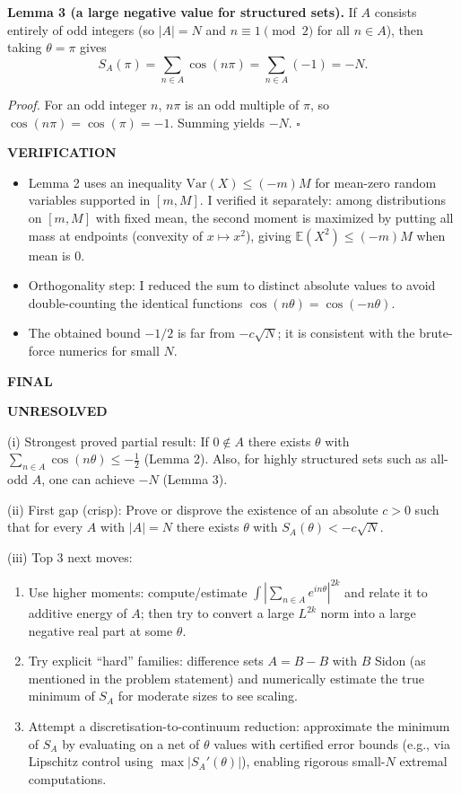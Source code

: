 \medskip
\noindent\textbf{Lemma 3 (a large negative value for structured sets).}
If $A$ consists entirely of odd integers (so $|A|=N$ and $n\equiv 1\pmod 2$ for all $n\in A$), then taking $\theta=\pi$ gives
\[
S_A(\pi)=\sum_{n\in A}\cos(n\pi)=\sum_{n\in A}(-1)=-N.
\]

\textit{Proof.}
For an odd integer $n$, $n\pi$ is an odd multiple of $\pi$, so $\cos(n\pi)=\cos(\pi)= -1$. Summing yields $-N$.
\hfill$\square$

\medskip
\noindent\textbf{VERIFICATION}

\begin{itemize}
\item Lemma 2 uses an inequality $\mathrm{Var}(X)\le (-m)M$ for mean-zero random variables supported in $[m,M]$. I verified it separately: among distributions on $[m,M]$ with fixed mean, the second moment is maximized by putting all mass at endpoints (convexity of $x\mapsto x^2$), giving $\mathbb{E}(X^2)\le (-m)M$ when mean is $0$.
\item Orthogonality step: I reduced the sum to distinct absolute values to avoid double-counting the identical functions $\cos(n\theta)=\cos(-n\theta)$.
\item The obtained bound $-1/2$ is far from $-c\sqrt{N}$; it is consistent with the brute-force numerics for small $N$.
\end{itemize}

\medskip
\noindent\textbf{FINAL}

\textbf{UNRESOLVED}

(i) Strongest proved partial result: If $0\notin A$ there exists $\theta$ with $\sum_{n\in A}\cos(n\theta)\le -\tfrac12$ (Lemma 2). Also, for highly structured sets such as all-odd $A$, one can achieve $-N$ (Lemma 3).

(ii) First gap (crisp): Prove or disprove the existence of an absolute $c>0$ such that for every $A$ with $|A|=N$ there exists $\theta$ with $S_A(\theta)<-c\sqrt{N}$.

(iii) Top 3 next moves:
\begin{enumerate}
\item Use higher moments: compute/estimate $\int |\sum_{n\in A} e^{in\theta}|^{2k}$ and relate it to additive energy of $A$; then try to convert a large $L^{2k}$ norm into a large negative real part at some $\theta$.
\item Try explicit ``hard'' families: difference sets $A=B-B$ with $B$ Sidon (as mentioned in the problem statement) and numerically estimate the true minimum of $S_A$ for moderate sizes to see scaling.
\item Attempt a discretisation-to-continuum reduction: approximate the minimum of $S_A$ by evaluating on a net of $\theta$ values with certified error bounds (e.g., via Lipschitz control using $\max |S_A'(\theta)|$), enabling rigorous small-$N$ extremal computations.
\end{enumerate}

